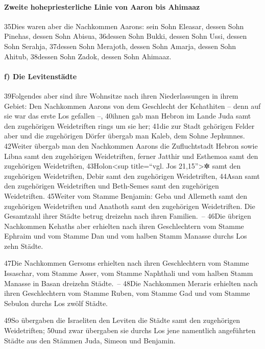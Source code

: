 \hypertarget{zweite-hohepriesterliche-linie-von-aaron-bis-ahimaaz}{%
\paragraph{Zweite hohepriesterliche Linie von Aaron bis
Ahimaaz}\label{zweite-hohepriesterliche-linie-von-aaron-bis-ahimaaz}}

35Dies waren aber die Nachkommen Aarons: sein Sohn Eleasar, dessen Sohn
Pinehas, dessen Sohn Abisua, 36dessen Sohn Bukki, dessen Sohn Ussi,
dessen Sohn Serahja, 37dessen Sohn Merajoth, dessen Sohn Amarja, dessen
Sohn Ahitub, 38dessen Sohn Zadok, dessen Sohn Ahimaaz.

\hypertarget{f-die-levitenstuxe4dte}{%
\paragraph{f) Die Levitenstädte}\label{f-die-levitenstuxe4dte}}

39Folgendes aber sind ihre Wohnsitze nach ihren Niederlassungen in ihrem
Gebiet: Den Nachkommen Aarons von dem Geschlecht der Kehathiten -- denn
auf sie war das erste Los gefallen --, 40ihnen gab man Hebron im Lande
Juda samt den zugehörigen Weidetriften rings um sie her; 41die zur Stadt
gehörigen Felder aber und die zugehörigen Dörfer übergab man Kaleb, dem
Sohne Jephunnes. 42Weiter übergab man den Nachkommen Aarons die
Zufluchtstadt Hebron sowie Libna samt den zugehörigen Weidetriften,
ferner Jatthir und Esthemoa samt den zugehörigen Weidetriften,
43Holon\textless sup title=``vgl. Jos 21,15''\textgreater✲ samt den
zugehörigen Weidetriften, Debir samt den zugehörigen Weidetriften,
44Asan samt den zugehörigen Weidetriften und Beth-Semes samt den
zugehörigen Weidetriften. 45Weiter vom Stamme Benjamin: Geba und
Allemeth samt den zugehörigen Weidetriften und Anathoth samt den
zugehörigen Weidetriften. Die Gesamtzahl ihrer Städte betrug dreizehn
nach ihren Familien.~-- 46Die übrigen Nachkommen Kehaths aber erhielten
nach ihren Geschlechtern vom Stamme Ephraim und vom Stamme Dan und vom
halben Stamm Manasse durchs Los zehn Städte.

47Die Nachkommen Gersoms erhielten nach ihren Geschlechtern vom Stamme
Issaschar, vom Stamme Asser, vom Stamme Naphthali und vom halben Stamm
Manasse in Basan dreizehn Städte.~-- 48Die Nachkommen Meraris erhielten
nach ihren Geschlechtern vom Stamme Ruben, vom Stamme Gad und vom Stamme
Sebulon durchs Los zwölf Städte.

49So übergaben die Israeliten den Leviten die Städte samt den
zugehörigen Weidetriften; 50und zwar übergaben sie durchs Los jene
namentlich angeführten Städte aus den Stämmen Juda, Simeon und Benjamin.

